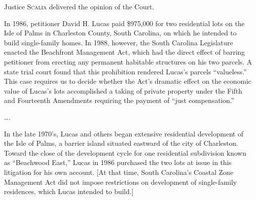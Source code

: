 

\opinion Justice \textsc{Scalia} delivered the opinion of the Court.

In 1986, petitioner David H. Lucas paid \$975,000 for two residential lots on
the Isle of Palms in Charleston County, South Carolina, on which he intended to
build single-family homes. In 1988, however, the South Carolina Legislature
enacted the Beachfront Management Act,
which had the direct effect of barring petitioner from
erecting any permanent habitable structures on his two parcels.
A state trial court found that this prohibition rendered
Lucas's parcels ``valueless.'' This case requires us
to decide whether the Act's dramatic effect on the economic value of Lucas's
lots accomplished a taking of private property under the Fifth and Fourteenth
Amendments requiring the payment of ``just compensation.''





\ldots.

In the late 1970's, Lucas and others began extensive residential development of
the Isle of Palms, a barrier island situated eastward of the city of Charleston.
Toward the close of the development cycle for one residential subdivision known
as ``Beachwood East,'' Lucas in 1986 purchased the two lots at issue in this
litigation for his own account. [At that time, South Carolina's Coastal Zone
Management Act did not impose restrictions on development of single-family
residences, which Lucas intended to build.]

